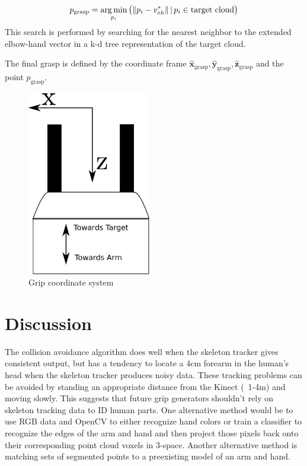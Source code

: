 \documentclass[10pt]{article}
\begin{document}
\begin{equation}
p_{\text{grasp}} = \operatorname*{arg\,min}_{p_i} \left(\,\norm{p_i - v_{eh}^*} | \,p_i \in \text{target cloud}\right)
\end{equation}
This search is performed by searching for the nearest neighbor to the extended elbow-hand vector in a k-d tree representation of the target cloud. 
\par The final grasp is defined by the coordinate frame $ \hat{\textbf{x}}_{\text{grasp}}, \hat{\textbf{y}}_{\text{grasp}}, \hat{\textbf{z}}_{\text{grasp}} $ and the point $p_{\text{grasp}}$.

\begin{figure}
\includegraphics[width=0.48\textwidth]{figures/gripper_diagram.eps}  
\caption{Grip coordinate system}
\label{fig:gripper}
\end{figure}


\section{Discussion} \label{sec:discussion}
\par The collision avoidance algorithm does well when the skeleton tracker gives consistent output, but has a tendency to locate a 4cm forearm in the human's head when the skeleton tracker produces noisy data. These tracking problems can be avoided by standing an appropriate distance from the Kinect (~1-4m) and moving slowly. This suggests that future grip generators shouldn't rely on skeleton tracking data to ID human parts. One alternative method would be to use RGB data and OpenCV to either recognize hand colors %
or train a classifier to recognize the edges of the arm and hand and then project those pixels back onto their corresponding point cloud voxels in 3-space. Another alternative method is matching sets of segmented points to a preexisting model of an arm and hand.     
\end{document}
